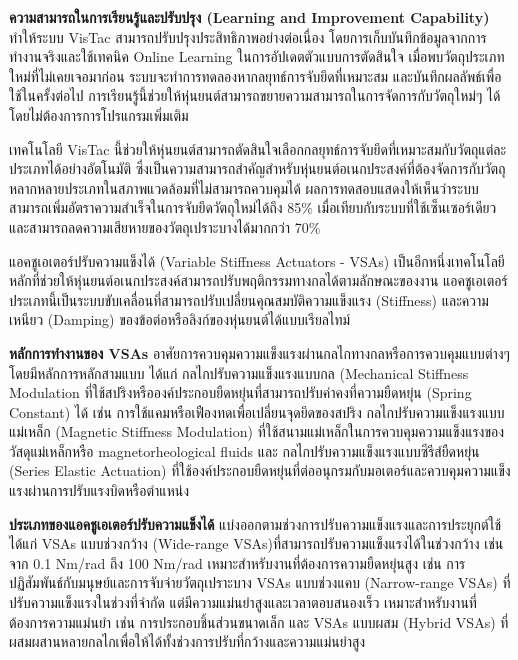 \documentclass[a4paper]{article}
\begin{document}
\textbf{ความสามารถในการเรียนรู้และปรับปรุง (Learning and Improvement Capability)} ทำให้ระบบ VisTac สามารถปรับปรุงประสิทธิภาพอย่างต่อเนื่อง โดยการเก็บบันทึกข้อมูลจากการทำงานจริงและใช้เทคนิค Online Learning ในการอัปเดตตัวแบบการตัดสินใจ เมื่อพบวัตถุประเภทใหม่ที่ไม่เคยเจอมาก่อน ระบบจะทำการทดลองหากลยุทธ์การจับยึดที่เหมาะสม และบันทึกผลลัพธ์เพื่อใช้ในครั้งต่อไป การเรียนรู้นี้ช่วยให้หุ่นยนต์สามารถขยายความสามารถในการจัดการกับวัตถุใหม่ๆ ได้โดยไม่ต้องการการโปรแกรมเพิ่มเติม

เทคโนโลยี VisTac นี้ช่วยให้หุ่นยนต์สามารถตัดสินใจเลือกกลยุทธ์การจับยึดที่เหมาะสมกับวัตถุแต่ละประเภทได้อย่างอัตโนมัติ ซึ่งเป็นความสามารถสำคัญสำหรับหุ่นยนต์อเนกประสงค์ที่ต้องจัดการกับวัตถุหลากหลายประเภทในสภาพแวดล้อมที่ไม่สามารถควบคุมได้ ผลการทดสอบแสดงให้เห็นว่าระบบสามารถเพิ่มอัตราความสำเร็จในการจับยึดวัตถุใหม่ได้ถึง 85\% เมื่อเทียบกับระบบที่ใช้เซ็นเซอร์เดียว และสามารถลดความเสียหายของวัตถุเปราะบางได้มากกว่า 70\%

แอคชูเอเตอร์ปรับความแข็งได้ (Variable Stiffness Actuators - VSAs) เป็นอีกหนึ่งเทคโนโลยีหลักที่ช่วยให้หุ่นยนต์อเนกประสงค์สามารถปรับพฤติกรรมทางกลได้ตามลักษณะของงาน แอคชูเอเตอร์ประเภทนี้เป็นระบบขับเคลื่อนที่สามารถปรับเปลี่ยนคุณสมบัติความแข็งแรง (Stiffness) และความเหนียว (Damping) ของข้อต่อหรือลิงก์ของหุ่นยนต์ได้แบบเรียลไทม์ \parencite{ieee2024compact}

\textbf{หลักการทำงานของ VSAs} อาศัยการควบคุมความแข็งแรงผ่านกลไกทางกลหรือการควบคุมแบบต่างๆ โดยมีหลักการหลักสามแบบ ได้แก่ กลไกปรับความแข็งแรงแบบกล (Mechanical Stiffness Modulation ที่ใช้สปริงหรือองค์ประกอบยืดหยุ่นที่สามารถปรับค่าคงที่ความยืดหยุ่น (Spring Constant) ได้ เช่น การใช้แคมหรือเฟืองทดเพื่อเปลี่ยนจุดยึดของสปริง กลไกปรับความแข็งแรงแบบแม่เหล็ก (Magnetic Stiffness Modulation) ที่ใช้สนามแม่เหล็กในการควบคุมความแข็งแรงของวัสดุแม่เหล็กหรือ magnetorheological fluids และ กลไกปรับความแข็งแรงแบบซีรีส์ยืดหยุ่น (Series Elastic Actuation) ที่ใช้องค์ประกอบยืดหยุ่นที่ต่ออนุกรมกับมอเตอร์และควบคุมความแข็งแรงผ่านการปรับแรงบิดหรือตำแหน่ง

\textbf{ประเภทของแอคชูเอเตอร์ปรับความแข็งได้} แบ่งออกตามช่วงการปรับความแข็งแรงและการประยุกต์ใช้ ได้แก่ VSAs แบบช่วงกว้าง (Wide-range VSAs)ที่สามารถปรับความแข็งแรงได้ในช่วงกว้าง เช่น จาก 0.1 Nm/rad ถึง 100 Nm/rad เหมาะสำหรับงานที่ต้องการความยืดหยุ่นสูง เช่น การปฏิสัมพันธ์กับมนุษย์และการจับจ่ายวัตถุเปราะบาง VSAs แบบช่วงแคบ (Narrow-range VSAs) ที่ปรับความแข็งแรงในช่วงที่จำกัด แต่มีความแม่นยำสูงและเวลาตอบสนองเร็ว เหมาะสำหรับงานที่ต้องการความแม่นยำ เช่น การประกอบชิ้นส่วนขนาดเล็ก และ VSAs แบบผสม (Hybrid VSAs) ที่ผสมผสานหลายกลไกเพื่อให้ได้ทั้งช่วงการปรับที่กว้างและความแม่นยำสูง
\end{document}
